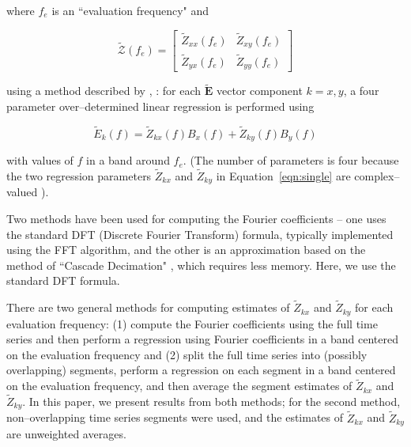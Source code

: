 \documentclass[draft,linenumbers]{agujournal2018}
\newcommand{\citeay}[1]{%
\citeauthor{#1}, \citeyear{#1}%
}
\begin{document}
\noindent where $f_e$ is an ``evaluation frequency" and
    
\begin{linenomath*}
    \begin{equation}
        \boldsymbol{\mathcal{\widetilde{Z}}}(f_e) = 
            \begin{bmatrix}
                \widetilde{Z}_{xx}(f_e) & \widetilde{Z}_{xy}(f_e)\\
                \widetilde{Z}_{yx}(f_e) & \widetilde{Z}_{yy}(f_e)
            \end{bmatrix}
    \end{equation}
\end{linenomath*}

\noindent using a method described by \citeay{Sims1971}: for each $\mathbf{\widetilde{E}}$ vector component $k=x,y$, a four parameter over--determined linear regression is performed using

\begin{equation}
\widetilde{E}_k(f) = \widetilde{Z}_{kx}(f)B_x(f) + \widetilde{Z}_{ky}(f)B_y(f)
\label{eqn:single}
\end{equation}

\noindent with values of $f$ in a band around $f_e$. (The number of parameters is four because the two regression parameters $\widetilde{Z}_{kx}$ and $\widetilde{Z}_{ky}$ in Equation~\ref{eqn:single} are complex--valued \citep{Egbert1986}).

Two methods have been used for computing the Fourier coefficients -- one uses the standard DFT (Discrete Fourier Transform) formula, typically implemented using the FFT algorithm, and the other is an approximation based on the method of ``Cascade Decimation" \citep{Wight1980}, which requires less memory. Here, we use the standard DFT formula.

There are two general methods for computing estimates of $\widetilde{Z}_{kx}$ and $\widetilde{Z}_{ky}$ for each evaluation frequency: (1) compute the Fourier coefficients using the full time series and then perform a regression using Fourier coefficients in a band centered on the evaluation frequency and (2) split the full time series into (possibly overlapping) segments, perform a regression on each segment in a band centered on the evaluation frequency, and then average the segment estimates of $\widetilde{Z}_{kx}$ and $\widetilde{Z}_{ky}$. In this paper, we present results from both methods; for the second method, non--overlapping time series segments were used, and the estimates of $\widetilde{Z}_{kx}$ and $\widetilde{Z}_{ky}$ are unweighted averages. 
\end{document}
